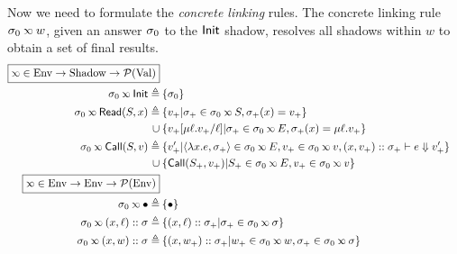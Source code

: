 Now we need to formulate the \emph{concrete linking} rules.
The concrete linking rule $\ctx_0\semlink w$, given an answer $\sigma_0$ to the $\textsf{Init}$ shadow, resolves all shadows within $w$ to obtain a set of final results.
\begin{align*}
  \fbox{$\semlink\in\Ctx\rightarrow\Event\rightarrow\pset(\Value)$}                                                                                                                           \\
  \ctx_0\semlink\InitE\triangleq                         & \: \{\ctx_0\}                                                                                                                      \\
  \ctx_0\semlink\ReadE(\event,x)\triangleq               & \: \{v_+|\ctx_+\in\ctx_0\semlink\event,\ctx_+(x)=v_+\}                                                                             \\
  \cup                                                   & \: \{v_+[\mu\ell.v_+/\ell]|\ctx_+\in\ctx_0\semlink E,\ctx_+(x)=\mu\ell.v_+\}                                                       \\
  \ctx_0\semlink\CallE(\event,v)\triangleq               & \: \{v_+'|\langle\lambda x.e,\ctx_+\rangle\in\ctx_0\semlink E, v_+\in\ctx_0\semlink v, (x,v_+)\cons\ctx_+\vdash e\Downarrow v_+'\} \\
  \cup                                                   & \: \{\CallE(\event_+,v_+)|\event_+\in\ctx_0\semlink E, v_+\in\ctx_0\semlink v\}                                                    \\
  \fbox{$\semlink\in\Ctx\rightarrow\Ctx\rightarrow\pset(\Ctx)$}                                                                                                                               \\
  \ctx_0\semlink\bullet\triangleq                        & \: \{\bullet\}                                                                                                                     \\
  \ctx_0\semlink(x,\ell)\cons\ctx\triangleq              & \: \{(x,\ell)\cons\ctx_+|\ctx_+\in\ctx_0\semlink\ctx\}                                                                             \\
  \ctx_0\semlink(x,w)\cons\ctx\triangleq                 & \: \{(x,w_+)\cons\ctx_+|w_+\in\ctx_0\semlink w,\ctx_+\in\ctx_0\semlink\ctx\}                                                       \\

\end{align*}

